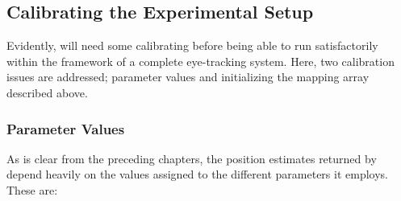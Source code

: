 \subsection{Calibrating the Experimental Setup}
\label{algo:future:calibrate}

Evidently, {\octopus} will need some calibrating before being able to
run satisfactorily within the framework of a complete eye-tracking
system.  Here, two calibration issues are addressed; parameter values
and initializing the mapping array described above.

\subsubsection{Parameter Values}

As is clear from the preceding chapters, the position estimates
returned by {\octopus} depend heavily on the values assigned to the
different parameters it employs.  These are:

